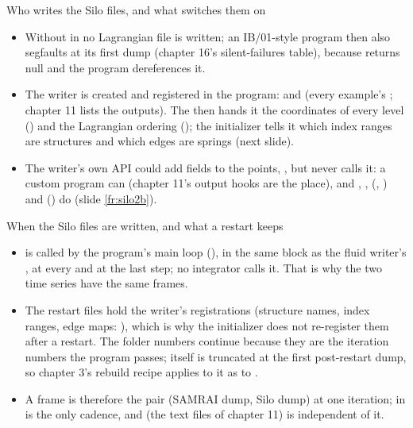 \documentclass[aspectratio=169,11pt]{beamer}
\begin{document}
\begin{frame}{Who writes the Silo files, and what switches them on}
\label{fr:silo1b}
\footnotesize
\begin{itemize}
  \item Without  in  no Lagrangian file is written; an IB/01-style program then also segfaults at its first dump (chapter 16's silent-failures table), because  returns null and the program dereferences it.
  \item The writer is created and registered in the program:  and  (every example's ; chapter 11 lists the outputs). The  then hands it the coordinates of every level () and the Lagrangian ordering (); the initializer tells it which index ranges are structures and which edges are springs (next slide).
  \item The writer's own API could add fields to the points, , but  never calls it: a custom program can (chapter 11's output hooks are the place), and , ,  (, ) and  () do (slide \ref{fr:silo2b}).
\end{itemize}
\end{frame}

\begin{frame}{When the Silo files are written, and what a restart keeps}
\label{fr:silo1c}
\footnotesize
\begin{itemize}
  \item {} is called by the program's main loop (), in the same  block as the fluid writer's , at every  and at the last step; no integrator calls it. That is why the two time series have the same frames.
  \item The restart files hold the writer's registrations (structure names, index ranges, edge maps: ), which is why the initializer does not re-register them after a restart. The folder numbers continue because they are the iteration numbers the program passes;  itself is truncated at the first post-restart dump, so chapter 3's rebuild recipe applies to it as to .
  \item A frame is therefore the pair (SAMRAI dump, Silo dump) at one iteration;  in  is the only cadence, and  (the  text files of chapter 11) is independent of it.
\end{itemize}
\end{frame}
\end{document}
